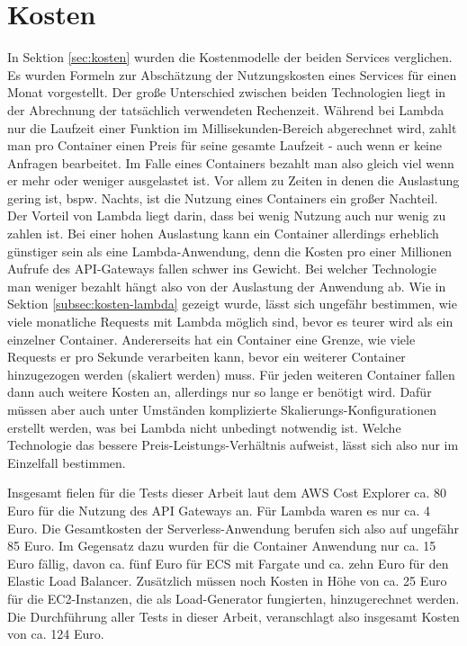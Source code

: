 \section{Kosten}
In Sektion \ref{sec:kosten} wurden die Kostenmodelle der beiden Services verglichen. Es wurden Formeln zur Abschätzung der Nutzungskosten eines Services für einen Monat vorgestellt. Der große Unterschied zwischen beiden Technologien liegt in der Abrechnung der tatsächlich verwendeten Rechenzeit. Während bei Lambda nur die Laufzeit einer Funktion im Millisekunden-Bereich abgerechnet wird, zahlt man pro Container einen Preis für seine gesamte Laufzeit - auch wenn er keine Anfragen bearbeitet. Im Falle eines Containers bezahlt man also gleich viel wenn er mehr oder weniger ausgelastet ist. Vor allem zu Zeiten in denen die Auslastung gering ist, bspw. Nachts, ist die Nutzung eines Containers ein großer Nachteil. Der Vorteil von Lambda liegt darin, dass bei wenig Nutzung auch nur wenig zu zahlen ist. Bei einer hohen Auslastung kann ein Container allerdings erheblich günstiger sein als eine Lambda-Anwendung, denn die Kosten pro einer Millionen Aufrufe des API-Gateways fallen schwer ins Gewicht. Bei welcher Technologie man weniger bezahlt hängt also von der Auslastung der Anwendung ab. Wie in Sektion \ref{subsec:kosten-lambda} gezeigt wurde, lässt sich ungefähr bestimmen, wie viele monatliche Requests mit Lambda möglich sind, bevor es teurer wird als ein einzelner Container. Andererseits hat ein Container eine Grenze, wie viele Requests er pro Sekunde verarbeiten kann, bevor ein weiterer Container hinzugezogen werden (skaliert werden) muss. Für jeden weiteren Container fallen dann auch weitere Kosten an, allerdings nur so lange er benötigt wird. Dafür müssen aber auch unter Umständen komplizierte Skalierungs-Konfigurationen erstellt werden, was bei Lambda nicht unbedingt notwendig ist. Welche Technologie das bessere Preis-Leistungs-Verhältnis aufweist, lässt sich also nur im Einzelfall bestimmen.

Insgesamt fielen für die Tests dieser Arbeit laut dem AWS Cost Explorer ca. 80 Euro für die Nutzung des API Gateways an. Für Lambda waren es nur ca. 4 Euro. Die Gesamtkosten der Serverless-Anwendung berufen sich also auf ungefähr 85 Euro.
Im Gegensatz dazu wurden für die Container Anwendung nur ca. 15 Euro fällig, davon ca. fünf Euro für ECS mit Fargate und ca. zehn Euro für den Elastic Load Balancer.
Zusätzlich müssen noch Kosten in Höhe von ca. 25 Euro für die EC2-Instanzen, die als Load-Generator fungierten, hinzugerechnet werden.
Die Durchführung aller Tests in dieser Arbeit, veranschlagt also insgesamt Kosten von ca. 124 Euro.

